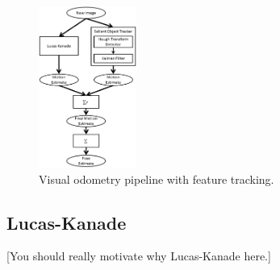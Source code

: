 \documentclass[letterpaper, 10 pt, conference]{ieeeconf}
\newcommand{\comment}[1]{{\color{red}[#1]}}
\begin{document}
%
%
%
%
%


\begin{figure}[tb]
	\centering
	\includegraphics[height=200px]{approach_overview.png}
	\caption{Visual odometry pipeline with feature tracking.}
    \label{approach}
\end{figure}

\subsection{Lucas-Kanade}

\comment{You should really motivate why Lucas-Kanade here.}
\end{document}
